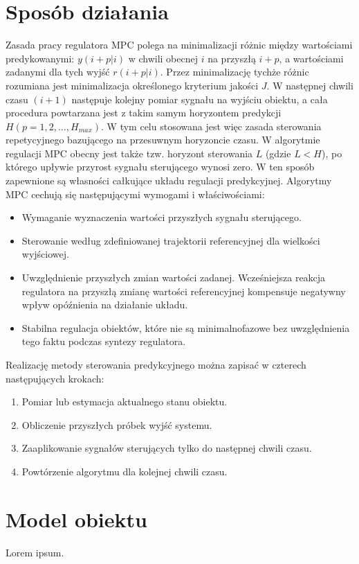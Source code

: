 \section{Sposób działania} \label{sec:howitworks}
Zasada pracy regulatora MPC polega na minimalizacji różnic między wartościami predykowanymi:
\(y(i+p|i)\) w chwili obecnej \(i\) na przyszłą \(i+p\), a wartościami zadanymi dla tych wyjść \(r(i+p|i)\).
Przez minimalizację tychże różnic rozumiana jest minimalizacja określonego kryterium jakości \(J\). W
następnej chwili czasu \((i+1)\) następuje kolejny pomiar sygnału na wyjściu obiektu, a cała procedura
powtarzana jest z takim samym horyzontem predykcji \(H(p=1,2,\dots ,H_{max})\). W tym celu stosowana jest
więc zasada sterowania repetycyjnego bazującego na przesuwnym horyzoncie czasu. W algorytmie regulacji MPC
obecny jest także tzw. horyzont sterowania \(L\) (gdzie \(L<H\)), po którego upływie przyrost sygnału
sterującego wynosi zero. W ten sposób zapewnione są własności całkujące układu regulacji predykcyjnej.
\newline Algorytmy MPC cechują się następującymi wymogami i właściwościami:
\begin{itemize}
	\item Wymaganie wyznaczenia wartości przyszłych sygnału sterującego.
	\item Sterowanie według zdefiniowanej trajektorii referencyjnej dla wielkości wyjściowej.
    \item Uwzględnienie przyszłych zmian wartości zadanej. Wcześniejsza reakcja regulatora na 
    przyszłą zmianę wartości referencyjnej kompensuje negatywny wpływ opóźnienia na działanie układu.
	\item Stabilna regulacja obiektów, które nie są minimalnofazowe bez uwzględnienia tego faktu podczas
    syntezy regulatora.
\end{itemize}
Realizację metody sterowania predykcyjnego można zapisać w czterech następujących krokach:
\begin{enumerate}
    \item Pomiar lub estymacja aktualnego stanu obiektu.
    \item Obliczenie przyszłych próbek wyjść systemu.
    \item Zaaplikowanie sygnałów sterujących tylko do następnej chwili czasu.
    \item Powtórzenie algorytmu dla kolejnej chwili czasu.
\end{enumerate}

\section{Model obiektu} \label{sec:model}
Lorem ipsum.

